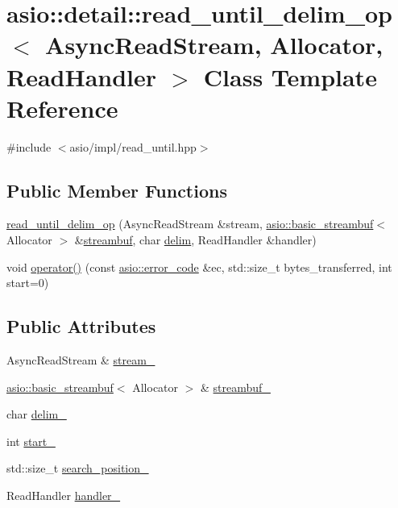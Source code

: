 \hypertarget{classasio_1_1detail_1_1read__until__delim__op}{}\section{asio\+:\+:detail\+:\+:read\+\_\+until\+\_\+delim\+\_\+op$<$ Async\+Read\+Stream, Allocator, Read\+Handler $>$ Class Template Reference}
\label{classasio_1_1detail_1_1read__until__delim__op}


{\ttfamily \#include $<$asio/impl/read\+\_\+until.\+hpp$>$}

\subsection*{Public Member Functions}
\begin{DoxyCompactItemize}
\item 
\hyperlink{classasio_1_1detail_1_1read__until__delim__op_a4b963caf32ddf424c0d5efea820acb1f}{read\+\_\+until\+\_\+delim\+\_\+op} (Async\+Read\+Stream \&stream, \hyperlink{classasio_1_1basic__streambuf}{asio\+::basic\+\_\+streambuf}$<$ Allocator $>$ \&\hyperlink{namespaceasio_a6a7ba348943527312eeace3492bf32ee}{streambuf}, char \hyperlink{group__async__read__until_gafbf62a75ad736aff941c1f70d4b3c223}{delim}, Read\+Handler \&handler)
\item 
void \hyperlink{classasio_1_1detail_1_1read__until__delim__op_ab1ba3faf6916391cd68a7d684b48ff4d}{operator()} (const \hyperlink{classasio_1_1error__code}{asio\+::error\+\_\+code} \&ec, std\+::size\+\_\+t bytes\+\_\+transferred, int start=0)
\end{DoxyCompactItemize}
\subsection*{Public Attributes}
\begin{DoxyCompactItemize}
\item 
Async\+Read\+Stream \& \hyperlink{classasio_1_1detail_1_1read__until__delim__op_a1bb807733f7f03ea6eb5956c251eea4a}{stream\+\_\+}
\item 
\hyperlink{classasio_1_1basic__streambuf}{asio\+::basic\+\_\+streambuf}$<$ Allocator $>$ \& \hyperlink{classasio_1_1detail_1_1read__until__delim__op_abdf7bd4e2142014b91065a9150d8f366}{streambuf\+\_\+}
\item 
char \hyperlink{classasio_1_1detail_1_1read__until__delim__op_a1759626e41e1848f782aac357b54c3f6}{delim\+\_\+}
\item 
int \hyperlink{classasio_1_1detail_1_1read__until__delim__op_a75f7ed240fb758a37f0893150aea7fd1}{start\+\_\+}
\item 
std\+::size\+\_\+t \hyperlink{classasio_1_1detail_1_1read__until__delim__op_aecea70ef337b9f61459c1671618aed95}{search\+\_\+position\+\_\+}
\item 
Read\+Handler \hyperlink{classasio_1_1detail_1_1read__until__delim__op_a4adc13e1e6271a6f531363401e515b54}{handler\+\_\+}
\end{DoxyCompactItemize}


